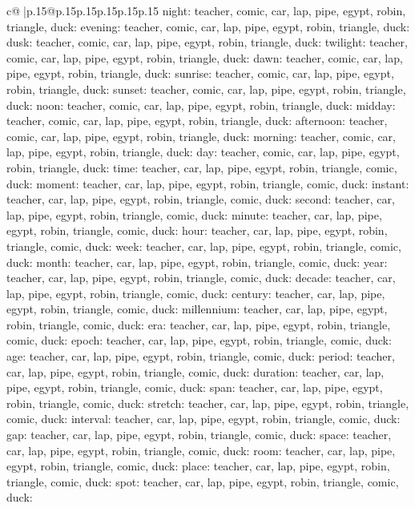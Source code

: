 \documentclass{article}
\begin{document}
{\begin{supertabular}{c@{$\;$}|p{.15\linewidth}@{}p{.15\linewidth}p{.15\linewidth}p{.15\linewidth}p{.15\linewidth}p{.15\linewidth}}
{{{night\nTARGETS: teacher, comic, car, lap, pipe, egypt, robin, triangle, duck\n\nCLUE: evening\nTARGETS: teacher, comic, car, lap, pipe, egypt, robin, triangle, duck\n\nCLUE: dusk\nTARGETS: teacher, comic, car, lap, pipe, egypt, robin, triangle, duck\n\nCLUE: twilight\nTARGETS: teacher, comic, car, lap, pipe, egypt, robin, triangle, duck\n\nCLUE: dawn\nTARGETS: teacher, comic, car, lap, pipe, egypt, robin, triangle, duck\n\nCLUE: sunrise\nTARGETS: teacher, comic, car, lap, pipe, egypt, robin, triangle, duck\n\nCLUE: sunset\nTARGETS: teacher, comic, car, lap, pipe, egypt, robin, triangle, duck\n\nCLUE: noon\nTARGETS: teacher, comic, car, lap, pipe, egypt, robin, triangle, duck\n\nCLUE: midday\nTARGETS: teacher, comic, car, lap, pipe, egypt, robin, triangle, duck\n\nCLUE: afternoon\nTARGETS: teacher, comic, car, lap, pipe, egypt, robin, triangle, duck\n\nCLUE: morning\nTARGETS: teacher, comic, car, lap, pipe, egypt, robin, triangle, duck\n\nCLUE: day\nTARGETS: teacher, comic, car, lap, pipe, egypt, robin, triangle, duck\n\nCLUE: time\nTARGETS: teacher, car, lap, pipe, egypt, robin, triangle, comic, duck\n\nCLUE: moment\nTARGETS: teacher, car, lap, pipe, egypt, robin, triangle, comic, duck\n\nCLUE: instant\nTARGETS: teacher, car, lap, pipe, egypt, robin, triangle, comic, duck\n\nCLUE: second\nTARGETS: teacher, car, lap, pipe, egypt, robin, triangle, comic, duck\n\nCLUE: minute\nTARGETS: teacher, car, lap, pipe, egypt, robin, triangle, comic, duck\n\nCLUE: hour\nTARGETS: teacher, car, lap, pipe, egypt, robin, triangle, comic, duck\n\nCLUE: week\nTARGETS: teacher, car, lap, pipe, egypt, robin, triangle, comic, duck\n\nCLUE: month\nTARGETS: teacher, car, lap, pipe, egypt, robin, triangle, comic, duck\n\nCLUE: year\nTARGETS: teacher, car, lap, pipe, egypt, robin, triangle, comic, duck\n\nCLUE: decade\nTARGETS: teacher, car, lap, pipe, egypt, robin, triangle, comic, duck\n\nCLUE: century\nTARGETS: teacher, car, lap, pipe, egypt, robin, triangle, comic, duck\n\nCLUE: millennium\nTARGETS: teacher, car, lap, pipe, egypt, robin, triangle, comic, duck\n\nCLUE: era\nTARGETS: teacher, car, lap, pipe, egypt, robin, triangle, comic, duck\n\nCLUE: epoch\nTARGETS: teacher, car, lap, pipe, egypt, robin, triangle, comic, duck\n\nCLUE: age\nTARGETS: teacher, car, lap, pipe, egypt, robin, triangle, comic, duck\n\nCLUE: period\nTARGETS: teacher, car, lap, pipe, egypt, robin, triangle, comic, duck\n\nCLUE: duration\nTARGETS: teacher, car, lap, pipe, egypt, robin, triangle, comic, duck\n\nCLUE: span\nTARGETS: teacher, car, lap, pipe, egypt, robin, triangle, comic, duck\n\nCLUE: stretch\nTARGETS: teacher, car, lap, pipe, egypt, robin, triangle, comic, duck\n\nCLUE: interval\nTARGETS: teacher, car, lap, pipe, egypt, robin, triangle, comic, duck\n\nCLUE: gap\nTARGETS: teacher, car, lap, pipe, egypt, robin, triangle, comic, duck\n\nCLUE: space\nTARGETS: teacher, car, lap, pipe, egypt, robin, triangle, comic, duck\n\nCLUE: room\nTARGETS: teacher, car, lap, pipe, egypt, robin, triangle, comic, duck\n\nCLUE: place\nTARGETS: teacher, car, lap, pipe, egypt, robin, triangle, comic, duck\n\nCLUE: spot\nTARGETS: teacher, car, lap, pipe, egypt, robin, triangle, comic, duck\n\nCLUE: }}}
\end{supertabular}}
\end{document}
